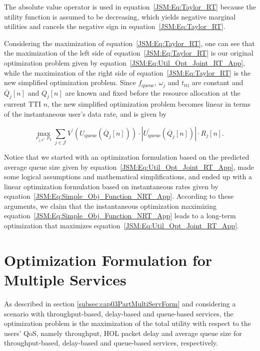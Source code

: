 \begin{apendicesenv}
The absolute value operator is used in equation~\eqref{JSM:Eq:Taylor_RT} because the utility function is assumed to be decreasing, which yields negative marginal utilities and cancels the negative sign in equation~\eqref{JSM:Eq:Taylor_RT}.

Considering the maximization of equation~\eqref{JSM:Eq:Taylor_RT}, one can see that the maximization of the left side of equation~\eqref{JSM:Eq:Taylor_RT} is our original optimization problem given by equation~\eqref{JSM:Eq:Util_Opt_Joint_RT_App}, while the maximization of the right side of equation~\eqref{JSM:Eq:Taylor_RT} is the new simplified optimization problem. 
Since $f_{\mathrm{queue}}$, $\omega_j$ and $t_{\mathrm{tti}}$ are constant and $\overline{Q}_{j}\left[n\right]$ and $Q_{j}\left[n\right]$ are known and fixed before the resource allocation at the current \ac{TTI} $n$, the new simplified optimization problem becomes linear in terms of the instantaneous user's data rate, and is given by

\begin{equation}
\label{JSM:Eq:Simple_Obj_Function_NRT_App}
\underset{\rho_{j,k},\;p_{k}}{\text{max}} \; \sum_{j \in \mathcal{J}} V^{'}\left(U_{\mathrm{queue}}\left(\overline{Q}_{j}\left[n\right]\right)\right) \cdot \left|U_{\mathrm{queue}}^{'}\left(\overline{Q}_{j}\left[n\right] \right)\right| \cdot R_{j}\left[n\right].
\end{equation}

Notice that we started with an optimization formulation based on the predicted average queue size given by equation~\eqref{JSM:Eq:Util_Opt_Joint_RT_App}, made some logical assumptions and mathematical simplifications, and ended up with a linear optimization formulation based on instantaneous rates given by equation~\eqref{JSM:Eq:Simple_Obj_Function_NRT_App}. 
According to these arguments, we claim that the instantaneous optimization maximizing equation~\eqref{JSM:Eq:Simple_Obj_Function_NRT_App} leads to a long-term optimization that maximizes equation~\eqref{JSM:Eq:Util_Opt_Joint_RT_App}.

\chapter{Optimization Formulation for Multiple Services}
\label{JSM:Ap:Utility_Opt_Mix}

As described in section \ref{subsec:cap03PartMultiServForm} and considering a scenario with throughput-based, delay-based and queue-based services, the optimization problem is the maximization of the total utility with respect to the users' \ac{QoS}, namely throughput, HOL packet delay and average queue size for throughput-based, delay-based and queue-based services, respectively. 


\end{apendicesenv}
